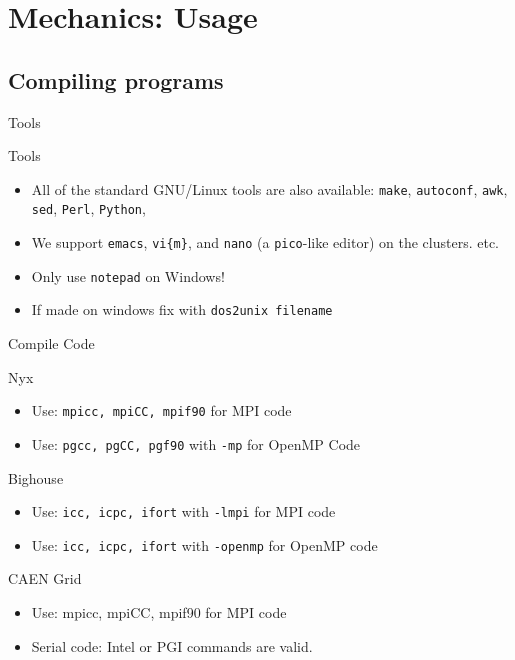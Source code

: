 \documentclass{beamer}
\begin{document}

  \section{Mechanics: Usage}
  \subsection{Compiling programs}
  \begin{frame}{Tools}
   \begin{block}{Tools}
    \begin{itemize}
    \item<1- > All of the standard GNU/Linux tools are also available: \texttt{make},
      \texttt{autoconf}, \texttt{awk}, \texttt{sed}, \texttt{Perl}, \texttt{Python},
    \item<2- > We support \texttt{emacs}, \texttt{vi\{m\}}, and \texttt{nano} (a 
      \texttt{pico}-like editor) on the clusters.
      etc.
    \item<3-| alert@1-> Only use \texttt{notepad} on Windows!
    \item<3-| alert@1-> If made on windows fix with \texttt{dos2unix filename}
    \end{itemize}
   \end{block}
  \end{frame}
  \begin{frame}{Compile Code}
   \begin{block}{Nyx}
   \begin{itemize}
    \item Use: \texttt{mpicc, mpiCC, mpif90} for MPI code
    \item Use: \texttt{pgcc, pgCC, pgf90} with \texttt{-mp} for OpenMP Code
   \end{itemize}
   \end{block}
   \begin{block}{Bighouse}
    \begin{itemize}
     \item Use: \texttt{icc, icpc, ifort} with \texttt{-lmpi} for MPI code
     \item Use: \texttt{icc, icpc, ifort} with \texttt{-openmp} for OpenMP code
    \end{itemize}
   \end{block}
   \begin{block}{CAEN Grid}
     \begin{itemize}
      \item Use: mpicc, mpiCC, mpif90 for MPI code
      \item Serial code: Intel or PGI commands are valid.
     \end{itemize}
   \end{block}
  \end{frame}
\end{document}
